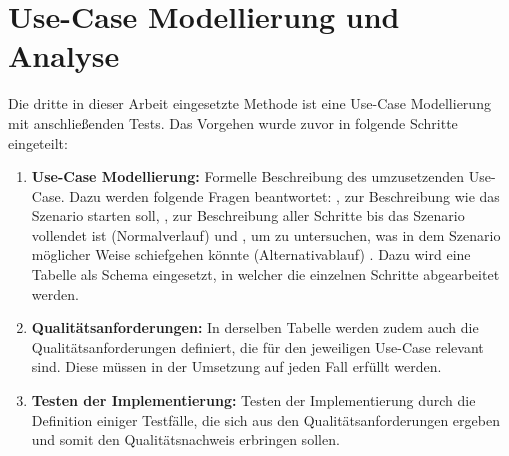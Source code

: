 \section{Use-Case Modellierung und Analyse}

Die dritte in dieser Arbeit eingesetzte Methode ist eine Use-Case Modellierung mit anschließenden Tests. Das Vorgehen wurde zuvor in folgende Schritte eingeteilt:
\begin{enumerate}
    \item \textbf{Use-Case Modellierung:} Formelle Beschreibung des umzusetzenden Use-Case. Dazu werden folgende Fragen beantwortet: \grqq{}, zur Beschreibung wie das Szenario starten soll, \grqq{}, zur Beschreibung aller Schritte bis das Szenario vollendet ist (Normalverlauf) und \grqq{}, um zu untersuchen, was in dem Szenario möglicher Weise schiefgehen könnte (Alternativablauf) \cite[Vgl.][S. 52]{Rosenberg2007}. Dazu wird eine Tabelle als Schema eingesetzt, in welcher die einzelnen Schritte abgearbeitet werden.
    \item \textbf{Qualitätsanforderungen:} In derselben Tabelle werden zudem auch die Qualitätsanforderungen definiert, die für den jeweiligen Use-Case relevant sind. Diese müssen in der Umsetzung auf jeden Fall erfüllt werden.
    \item \textbf{Testen der Implementierung:} Testen der Implementierung durch die Definition einiger Testfälle, die sich aus den Qualitätsanforderungen ergeben und somit den Qualitätsnachweis erbringen sollen.
\end{enumerate}